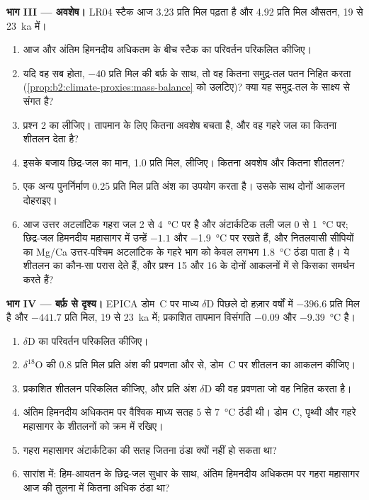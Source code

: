 \begin{problem}[{सप्ताहांत समस्या --- एक सीपी, दो संकेत}]
\medskip\noindent\textbf{भाग III --- अवशेष।}
LR04 स्टैक आज \num{3.23} प्रति मिल पढ़ता है और \num{4.92} प्रति मिल औसतन, 19 से
\qty{23}{ka} में।
\begin{enumerate}[resume]
  \item आज और अंतिम हिमनदीय अधिकतम के बीच स्टैक का परिवर्तन परिकलित कीजिए।
  \item यदि वह सब  होता, $-40$ प्रति मिल की बर्फ़ के साथ, तो वह कितना समुद्र-तल पतन
        निहित करता (\cref{prop:b2:climate-proxies:mass-balance} को उलटिए)? क्या यह
        समुद्र-तल के साक्ष्य से संगत है?
  \item प्रश्न 2 का  लीजिए। तापमान के लिए कितना अवशेष बचता है, और
        वह गहरे जल का कितना शीतलन देता है?
  \item इसके बजाय छिद्र-जल का मान, \num{1.0} प्रति मिल, लीजिए। कितना अवशेष और कितना शीतलन?
  \item एक अन्य पुनर्निर्माण \num{0.25} प्रति मिल प्रति अंश का उपयोग करता है। उसके साथ दोनों आकलन दोहराइए।
  \item आज उत्तर अटलांटिक गहरा जल 2 से \qty{4}{\celsius} पर है और अंटार्कटिक तली
        जल 0 से \qty{1}{\celsius} पर; छिद्र-जल हिमनदीय महासागर में उन्हें $-1.1$ और \qty{-1.9}{\celsius}
        पर रखते हैं, और नितलवासी सीपियों का Mg/Ca उत्तर-पश्चिम अटलांटिक के गहरे भाग को
        केवल लगभग \qty{1.8}{\celsius} ठंडा पाता है। ये शीतलन का कौन-सा परास देते हैं, और प्रश्न 15 और 16 के
        दोनों आकलनों में से किसका समर्थन करते हैं?
\end{enumerate}

\medskip\noindent\textbf{भाग IV --- बर्फ़ से दृश्य।}
EPICA डोम~C पर माध्य $\delta$D पिछले दो हज़ार वर्षों में $-396.6$ प्रति मिल है और
$-441.7$ प्रति मिल, 19 से \qty{23}{ka} में; प्रकाशित तापमान विसंगति $-0.09$ और
\qty{-9.39}{\celsius} है।
\begin{enumerate}[resume]
  \item $\delta$D का परिवर्तन परिकलित कीजिए।
  \item $\delta^{18}$O की \num{0.8} प्रति मिल प्रति अंश की प्रवणता और  से,
        डोम~C पर शीतलन का आकलन कीजिए।
  \item प्रकाशित शीतलन परिकलित कीजिए, और प्रति अंश $\delta$D की वह प्रवणता जो वह निहित करता है।
  \item अंतिम हिमनदीय अधिकतम पर वैश्विक माध्य सतह 5 से \qty{7}{\celsius} ठंडी थी।
        डोम~C, पृथ्वी और गहरे महासागर के शीतलनों को क्रम में रखिए।
  \item गहरा महासागर अंटार्कटिका की सतह जितना ठंडा क्यों नहीं हो सकता था?
  \item सारांश में: हिम-आयतन के छिद्र-जल सुधार के साथ, अंतिम हिमनदीय अधिकतम पर गहरा महासागर
        आज की तुलना में कितना अधिक ठंडा था?
\end{enumerate}
\end{problem}
